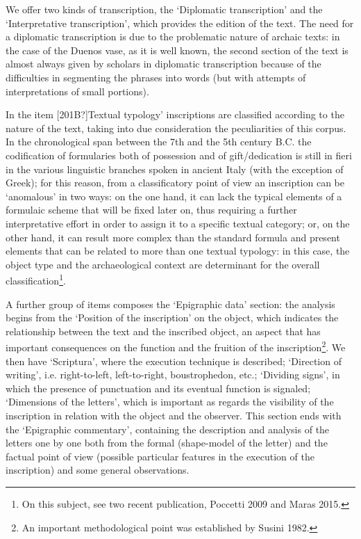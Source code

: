 \documentclass[amsthm,ebook]{saparticle}
\begin{document}
We offer two kinds of transcription, the ‘Diplomatic transcription’ and the ‘Interpretative transcription’, which
provides the edition of the text. The need for a diplomatic transcription is due to the problematic nature of archaic
texts: in the case of the Duenos vase, as it is well known, the second section of the text is almost always given by
scholars in diplomatic transcription because of the difficulties in segmenting the phrases into words (but with
attempts of interpretations of small portions). 

In the item [201B?]Textual typology’ inscriptions are classified according to the nature of the text, taking into due
consideration the peculiarities of this corpus. In the chronological span between the 7th and the 5th century B.C. the
codification of formularies both of possession and of gift/dedication is still in fieri in the various linguistic
branches spoken in ancient Italy (with the exception of Greek); for this reason, from a classificatory point of view an
inscription can be ‘anomalous’ in two ways: on the one hand, it can lack the typical elements of a formulaic scheme
that will be fixed later on, thus requiring a further interpretative effort in order to assign it to a specific textual
category; or, on the other hand, it can result more complex than the standard formula and present elements that can be
related to more than one textual typology: in this case, the object type and the archaeological context are determinant
for the overall classification\footnote{On this subject, see two recent publication, Poccetti 2009 and Maras 2015.}. 

A further group of items composes the ‘Epigraphic data’ section: the analysis begins from the ‘Position of the
inscription’ on the object, which indicates the relationship between the text and the inscribed object, an aspect that
has important consequences on the function and the fruition of the inscription\footnote{An important methodological
point was established by Susini 1982.}. We then have ‘Scriptura’, where the execution technique is described;
‘Direction of writing’, i.e. right-to-left, left-to-right, boustrophedon, etc.; ‘Dividing signs’, in which the presence
of punctuation and its eventual function is signaled; ‘Dimensions of the letters’, which is important as regards the
visibility of the inscription in relation with the object and the observer. This section ends with the ‘Epigraphic
commentary’, containing the description and analysis of the letters one by one both from the formal (shape-model of the
letter) and the factual point of view (possible particular features in the execution of the inscription) and some
general observations.
\end{document}
